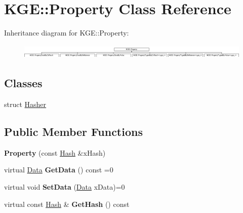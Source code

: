 \hypertarget{class_k_g_e_1_1_property}{\section{K\-G\-E\-:\-:Property Class Reference}
\label{class_k_g_e_1_1_property}
}
Inheritance diagram for K\-G\-E\-:\-:Property\-:\begin{figure}[H]
\begin{center}
\leavevmode
\includegraphics[height=0.699126cm]{class_k_g_e_1_1_property}
\end{center}
\end{figure}
\subsection*{Classes}
\begin{DoxyCompactItemize}
\item 
struct \hyperlink{struct_k_g_e_1_1_property_1_1_hasher}{Hasher}
\end{DoxyCompactItemize}
\subsection*{Public Member Functions}
\begin{DoxyCompactItemize}
\item 
\hypertarget{class_k_g_e_1_1_property_a9db7ae4492e59bd82fd9ed94c49653ee}{{\bfseries Property} (const \hyperlink{class_k_g_e_1_1_hash}{Hash} \&x\-Hash)}\label{class_k_g_e_1_1_property_a9db7ae4492e59bd82fd9ed94c49653ee}

\item 
\hypertarget{class_k_g_e_1_1_property_a2ede2e0955cacf076183e178219673c4}{virtual \hyperlink{class_k_g_e_1_1_data}{Data} {\bfseries Get\-Data} () const =0}\label{class_k_g_e_1_1_property_a2ede2e0955cacf076183e178219673c4}

\item 
\hypertarget{class_k_g_e_1_1_property_ae719405484bc7acb44d97cf781fe678d}{virtual void {\bfseries Set\-Data} (\hyperlink{class_k_g_e_1_1_data}{Data} x\-Data)=0}\label{class_k_g_e_1_1_property_ae719405484bc7acb44d97cf781fe678d}

\item 
\hypertarget{class_k_g_e_1_1_property_a45a44d831ad706b510c9f8a0c6ba205c}{virtual const \hyperlink{class_k_g_e_1_1_hash}{Hash} \& {\bfseries Get\-Hash} () const }\label{class_k_g_e_1_1_property_a45a44d831ad706b510c9f8a0c6ba205c}

\end{DoxyCompactItemize}
